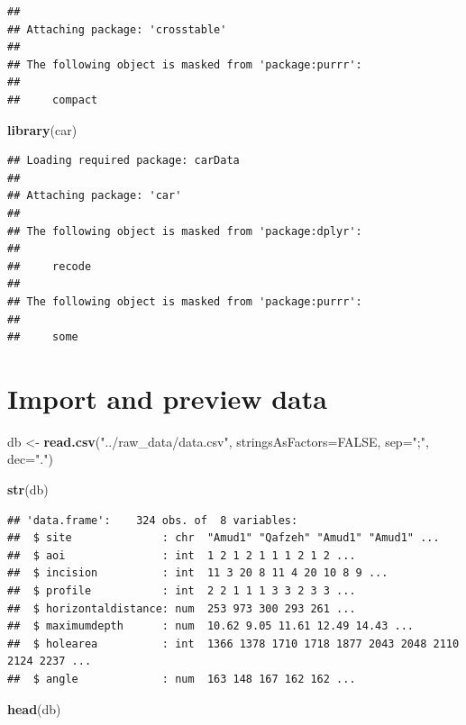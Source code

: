 \documentclass[
]{article}
\newenvironment{Shaded}{\begin{snugshade}}{\end{snugshade}}
\newcommand{\AttributeTok}[1]{\textcolor[rgb]{0.13,0.29,0.53}{#1}}
\newcommand{\ConstantTok}[1]{\textcolor[rgb]{0.56,0.35,0.01}{#1}}
\newcommand{\FunctionTok}[1]{\textcolor[rgb]{0.13,0.29,0.53}{\textbf{#1}}}
\newcommand{\NormalTok}[1]{#1}
\newcommand{\OtherTok}[1]{\textcolor[rgb]{0.56,0.35,0.01}{#1}}
\newcommand{\StringTok}[1]{\textcolor[rgb]{0.31,0.60,0.02}{#1}}
\begin{document}
\begin{verbatim}
## 
## Attaching package: 'crosstable'
## 
## The following object is masked from 'package:purrr':
## 
##     compact
\end{verbatim}

\begin{Shaded}
\begin{Highlighting}[]
\FunctionTok{library}\NormalTok{(car)}
\end{Highlighting}
\end{Shaded}

\begin{verbatim}
## Loading required package: carData
## 
## Attaching package: 'car'
## 
## The following object is masked from 'package:dplyr':
## 
##     recode
## 
## The following object is masked from 'package:purrr':
## 
##     some
\end{verbatim}

\hypertarget{import-and-preview-data}{%
\section{Import and preview data}\label{import-and-preview-data}}

\begin{Shaded}
\begin{Highlighting}[]
\NormalTok{db }\OtherTok{\textless{}{-}} \FunctionTok{read.csv}\NormalTok{(}\StringTok{"../raw\_data/data.csv"}\NormalTok{, }\AttributeTok{stringsAsFactors=}\ConstantTok{FALSE}\NormalTok{, }\AttributeTok{sep=}\StringTok{";"}\NormalTok{, }\AttributeTok{dec=}\StringTok{"."}\NormalTok{)}

\FunctionTok{str}\NormalTok{(db)}
\end{Highlighting}
\end{Shaded}

\begin{verbatim}
## 'data.frame':    324 obs. of  8 variables:
##  $ site              : chr  "Amud1" "Qafzeh" "Amud1" "Amud1" ...
##  $ aoi               : int  1 2 1 2 1 1 1 2 1 2 ...
##  $ incision          : int  11 3 20 8 11 4 20 10 8 9 ...
##  $ profile           : int  2 2 1 1 1 3 3 2 3 3 ...
##  $ horizontaldistance: num  253 973 300 293 261 ...
##  $ maximumdepth      : num  10.62 9.05 11.61 12.49 14.43 ...
##  $ holearea          : int  1366 1378 1710 1718 1877 2043 2048 2110 2124 2237 ...
##  $ angle             : num  163 148 167 162 162 ...
\end{verbatim}

\begin{Shaded}
\begin{Highlighting}[]
\FunctionTok{head}\NormalTok{(db)}
\end{Highlighting}
\end{Shaded}
\end{document}
